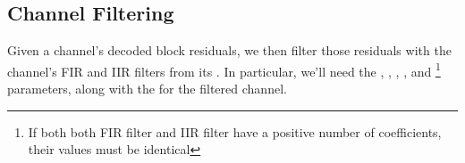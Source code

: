 
\clearpage

\subsection{Channel Filtering}

Given a channel's decoded block residuals, we then filter those residuals
with the channel's FIR and IIR filters from its .
In particular, we'll need the , ,
, ,  and
\footnote{If both both FIR filter and IIR filter
have a positive number of coefficients, their  values must be
identical}
parameters, along with the  for the filtered channel.

